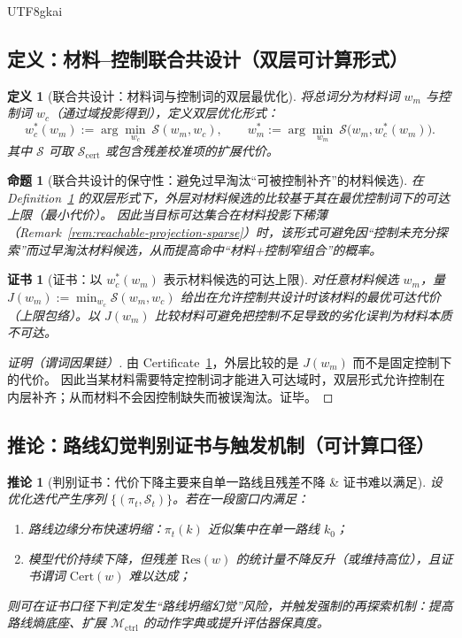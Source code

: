 \documentclass[12pt]{article}
\newtheorem{definition}{定义}[section]
\newtheorem{proposition}{命题}[section]
\newtheorem{corollary}{推论}[section]
\newtheorem{certificate}{证书}[section]
\begin{document}
\begin{CJK*}{UTF8}{gkai}
\subsection{定义：材料--控制联合共设计（双层可计算形式）}

\begin{definition}[联合共设计：材料词与控制词的双层最优化]
\label{def:bilevel-codesign}
将总词分为材料词 $w_m$ 与控制词 $w_c$（通过域投影得到），定义双层优化形式：
\[
w_c^\ast(w_m):=\arg\min_{w_c}\ \mathcal{S}(w_m,w_c),
\qquad
w_m^\ast:=\arg\min_{w_m}\ \mathcal{S}\bigl(w_m,w_c^\ast(w_m)\bigr).
\]
其中 $\mathcal{S}$ 可取 $\mathcal{S}_{\mathrm{cert}}$ 或包含残差校准项的扩展代价。
\end{definition}

\begin{proposition}[联合共设计的保守性：避免过早淘汰“可被控制补齐”的材料候选]
\label{prop:codesign-benefit}
在 Definition~\ref{def:bilevel-codesign} 的双层形式下，外层对材料候选的比较基于其在最优控制词下的可达上限（最小代价）。
因此当目标可达集合在材料投影下稀薄（Remark~\ref{rem:reachable-projection-sparse}）时，该形式可避免因“控制未充分探索”而过早淘汰材料候选，从而提高命中“材料+控制窄组合”的概率。
\end{proposition}

\begin{certificate}[证书：以 $w_c^\ast(w_m)$ 表示材料候选的可达上限]
\label{cert:codesign-upper-envelope}
对任意材料候选 $w_m$，量 $J(w_m):=\min_{w_c}\mathcal{S}(w_m,w_c)$ 给出在允许控制共设计时该材料的最优可达代价（上限包络）。以 $J(w_m)$
  比较材料可避免把控制不足导致的劣化误判为材料本质不可达。
\end{certificate}

\begin{proof}[证明（谓词因果链）]
由 Certificate~\ref{cert:codesign-upper-envelope}，外层比较的是 $J(w_m)$ 而不是固定控制下的代价。
因此当某材料需要特定控制词才能进入可达域时，双层形式允许控制在内层补齐；从而材料不会因控制缺失而被误淘汰。证毕。
\end{proof}

\subsection{推论：路线幻觉判别证书与触发机制（可计算口径）}

\begin{corollary}[判别证书：代价下降主要来自单一路线且残差不降 \& 证书难以满足]
\label{cor:hallucination-certificate}
设优化迭代产生序列 $\{(\pi_t,\mathcal{S}_t)\}$。若在一段窗口内满足：
\begin{enumerate}
  \item 路线边缘分布快速坍缩：$\pi_t(k)$ 近似集中在单一路线 $k_0$；
  \item 模型代价持续下降，但残差 $\mathrm{Res}(w)$ 的统计量不降反升（或维持高位），且证书谓词 $\mathrm{Cert}(w)$ 难以达成；
\end{enumerate}
则可在证书口径下判定发生“路线坍缩幻觉”风险，并触发强制的再探索机制：提高路线熵底座、扩展 $\mathcal{M}_{\mathrm{ctrl}}$ 的动作字典或提升评估器保真度。
\end{corollary}


\end{CJK*}
\end{document}
